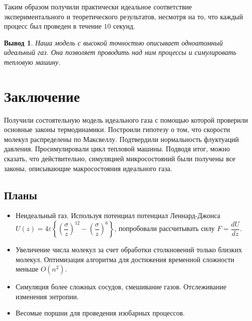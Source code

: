 \documentclass[twoside,twocolumn, 11pt]{article}
\theoremstyle{plain}
\newtheorem{conclusion}{Вывод}
\theoremstyle{definition}
\begin{document}
Таким образом получили практически идеальное соответствие экспериментального и теоретического результатов, несмотря на то, что
каждый процесс был проведен в течение $10$ секунд.

\begin{conclusion}
Наша модель с высокой точностью описывает одноатомный идеальный газ. Она позволяет проводить над ним процессы и симулировать тепловую машину.
\end{conclusion}

\section{Заключение}
\indent Получили состоятельную модель идеального газа с помощью которой проверили основные законы термодинамики. Построили гипотезу о том,
что скорости молекул распределены по Максвеллу. Подтвердили нормальность флуктуаций давления. Просимулировали цикл тепловой машины.
Подводя итог, можно сказать, что действительно, симуляцией микросостояний были получены все законы, описывающие макросостояния идеального газа.

\subsection{Планы}
\begin{itemize}
\item Неидеальный газ.
Используя потенциал потенциал Леннард-Джонса $ U(z)=4 \varepsilon\left\{\left(\dfrac{\sigma}{z}\right)^{12}-\left(\dfrac{\sigma}{z}\right)^{6}\right\}$, попробовали
рассчитывать силу $F = \dfrac{dU}{dz}$.
\item Увеличение числа молекул за счет обработки столкновений только близких молекул. Оптимизация алгоритма для достижения временной сложности меньше $O(n^2)$.
\item Симуляция более сложных сосудов, смешивание газов. Отслеживание изменения энтропии.
\item Весомые поршни для проведения изобарных процессов.
\end{itemize}

\end{document}
